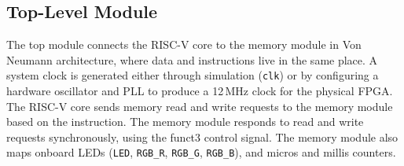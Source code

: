 \subsection{Top-Level Module}

The top module connects the RISC-V core to the memory module in Von Neumann architecture, where data and instructions live in the same place.
A system clock is generated either through simulation (\texttt{clk}) or by configuring a hardware oscillator and PLL to produce a 12\,MHz clock for the physical FPGA.
The RISC-V core sends memory read and write requests to the memory module based on the instruction.
The memory module responds to read and write requests synchronously, using the funct3 control signal.
The memory module also maps onboard LEDs (\texttt{LED}, \texttt{RGB\_R}, \texttt{RGB\_G}, \texttt{RGB\_B}), and micros and millis counters.
